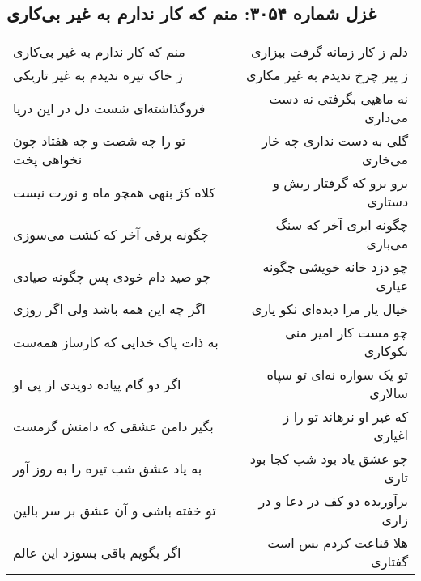 \begin{center}
\section*{غزل شماره ۳۰۵۴: منم که کار ندارم به غیر بی‌کاری}
\label{sec:3054}
\begin{longtable}{l p{0.5cm} r}
منم که کار ندارم به غیر بی‌کاری
&&
دلم ز کار زمانه گرفت بیزاری
\\
ز خاک تیره ندیدم به غیر تاریکی
&&
ز پیر چرخ ندیدم به غیر مکاری
\\
فروگذاشته‌ای شست دل در این دریا
&&
نه ماهیی بگرفتی نه دست می‌داری
\\
تو را چه شصت و چه هفتاد چون نخواهی پخت
&&
گلی به دست نداری چه خار می‌خاری
\\
کلاه کژ بنهی همچو ماه و نورت نیست
&&
برو برو که گرفتار ریش و دستاری
\\
چگونه برقی آخر که کشت می‌سوزی
&&
چگونه ابری آخر که سنگ می‌باری
\\
چو صید دام خودی پس چگونه صیادی
&&
چو دزد خانه خویشی چگونه عیاری
\\
اگر چه این همه باشد ولی اگر روزی
&&
خیال یار مرا دیده‌ای نکو یاری
\\
به ذات پاک خدایی که کارساز همه‌ست
&&
چو مست کار امیر منی نکوکاری
\\
اگر دو گام پیاده دویدی از پی او
&&
تو یک سواره نه‌ای تو سپاه سالاری
\\
بگیر دامن عشقی که دامنش گرمست
&&
که غیر او نرهاند تو را ز اغیاری
\\
به یاد عشق شب تیره را به روز آور
&&
چو عشق یاد بود شب کجا بود تاری
\\
تو خفته باشی و آن عشق بر سر بالین
&&
برآوریده دو کف در دعا و در زاری
\\
اگر بگویم باقی بسوزد این عالم
&&
هلا قناعت کردم بس است گفتاری
\\
\end{longtable}
\end{center}
